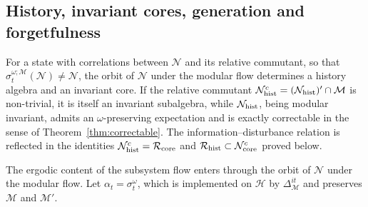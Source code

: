 \documentclass[a4paper,11pt]{article}
\theoremstyle{definition}
\newcommand{\mR}{\mathcal{R}}
\newcommand{\mN}{\mathcal{N}}
\newcommand{\mM}{\mathcal{M}}
\begin{document}
\subsection{History, invariant cores, generation and forgetfulness}\label{subsec:QEC-history-memory}

For a state with correlations between $\mN$ and its relative commutant, so that $\sigma^{\omega;\mM}_t(\mN)\ne\mN$, the orbit of $\mN$ under the modular flow determines a history algebra and an invariant core. If the relative commutant $\mN_{\rm hist}^c=(\mN_{\rm hist})'\cap \mM$ is non-trivial, it is itself an invariant subalgebra, while $\mN_{\rm hist}$, being modular invariant, admits an $\omega$-preserving expectation and is exactly correctable in the sense of Theorem~\ref{thm:correctable}. The information--disturbance relation is reflected in the identities $\mN_{\rm hist}^c=\mR_{\rm core}$ and $\mR_{\rm hist}\subset \mN_{\rm core}^c$ proved below.

The ergodic content of the subsystem flow enters through the orbit of $\mN$ under the modular flow. Let $\alpha_t=\sigma^{\omega}_t$, which is implemented on $\mathcal H$ by $\Delta_{\mM}^{it}$ and preserves $\mM$ and $\mM'$.
\end{document}
